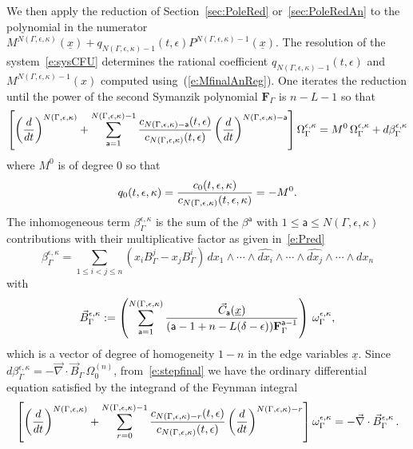 \documentclass[a4paper,12pt]{article}
\numberwithin{equation}{section}
\numberwithin{figure}{section}
\begin{document}
We then apply the reduction of Section~\ref{sec:PoleRed} or~\ref{sec:PoleRedAn} to
the polynomial in the numerator
$M^{
      N(\Gamma,\epsilon,\kappa)}(\underline x)+q_{N(\Gamma,\epsilon,\kappa)-1}(t,\epsilon)
    P^{N(\Gamma,\epsilon,\kappa)-1}(\underline x)$.
The resolution of the
system~\eqref{e:sysCFU} determines the  rational coefficient
$q_{N(\Gamma,\epsilon,\kappa)-1}(t,\epsilon)$ and
$M^{N(\Gamma,\epsilon,\kappa)-1}(x)$ computed using~(\ref{e:MfinalAnReg}). One
iterates the reduction until the power of  the second Symanzik
polynomial $\textbf{F}_\Gamma$ is $n-L-1$ so
that
\begin{equation}\label{e:stepfinal}
\left[\left(d\over dt\right)^{N(\Gamma,\epsilon,\kappa)}
  +\sum_{\mathsf{a}=1}^{N(\Gamma,\epsilon,\kappa)-1}
  {c_{N(\Gamma,\epsilon,\kappa)-\mathsf{a}}(t,\epsilon)\over c_{N(\Gamma,\epsilon,\kappa)}(t,\epsilon)} \left(d\over dt\right)^{N(\Gamma,\epsilon,\kappa)-\mathsf{a}}\right] \Omega_\Gamma^{\epsilon,\kappa}=M^{0}\,\Omega_\Gamma^{\epsilon,\kappa}+ d\beta_\Gamma^{\epsilon ,\kappa}
\end{equation}
where $M^0$ is of degree 0 so that
\begin{equation}
  q_0(t,\epsilon,\kappa)=  {c_{0}(t,\epsilon,\kappa)\over
    c_{N(\Gamma,\epsilon,\kappa)}(t,\epsilon,\kappa)}= -M^0  .
\end{equation}
The inhomogeneous term  $\beta_\Gamma^{\epsilon,\kappa} $ is the sum of the
$\beta^{\mathsf{a}}$ with $1\leq
\mathsf{a}\leq N(\Gamma,\epsilon,\kappa)$
contributions with their multiplicative factor as given
in~\eqref{e:Pred}
\begin{equation}
  \label{e:betaGamma}
  \beta_\Gamma^{\epsilon,\kappa}= \sum_{1\leq i<j\leq n} (x_i B^j_\Gamma- x_j B^i_\Gamma) \,
  dx_1\wedge \cdots \wedge \widehat{dx_i}\wedge \cdots \wedge\widehat{dx_j}\wedge
  \cdots \wedge dx_n 
\end{equation}
with
\begin{equation}
  \label{e:BetaGamma}
  \vec B^{\epsilon,\kappa}_\Gamma:=\left(\sum_{\mathsf{a}=1}^{N(\Gamma,\epsilon,\kappa)} {
      \vec C_{\mathsf{a}} (\underline x) \over
   ( \mathsf{a}-1+n-L(\delta-\epsilon))\mathbf{F}_\Gamma^{\mathsf{a}-1}}\right) \,\omega_\Gamma^{\epsilon,\kappa} ,
\end{equation}
which is a vector of degree of homogeneity $1-n$ in the edge variables
$\underline x$.
Since $d\beta_\Gamma^{\epsilon,\kappa}= -\vec\nabla\cdot \vec B_\Gamma\,
\Omega_0^{(n)}$, from~\eqref{e:stepfinal} we have the ordinary
differential equation satisfied by the integrand of the Feynman
integral
\begin{equation}\label{e:stepfinalode}
\left[\left(d\over dt\right)^{N(\Gamma,\epsilon,\kappa)}
  +\sum_{r=0}^{N(\Gamma,\epsilon,\kappa)-1}
  {c_{N(\Gamma,\epsilon,\kappa)-r}(t,\epsilon)\over c_{N(\Gamma,\epsilon,\kappa)}(t,\epsilon)} \left(d\over dt\right)^{N(\Gamma,\epsilon,\kappa)-r}\right] \omega_\Gamma^{\epsilon,\kappa} =-\vec\nabla\cdot \vec B^{\epsilon,\kappa}_\Gamma\,.
\end{equation}
\end{document}
